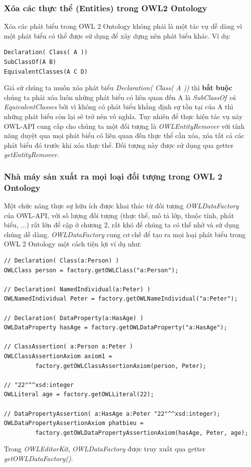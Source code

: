 \subsubsection{Xóa các thực thể (Entities) trong OWL2 Ontology}
Xóa các phát biểu trong OWL 2 Ontology không phải là một tác vụ dễ dàng vì một phát biểu có thể được sử dụng để xây dựng nên phát biểu khác. Ví dụ:
\begin{verbatim}
Declaration( Class( A ))
SubClassOf(A B)
EquivalentClasses(A C D)
\end{verbatim}
Giả sử chúng ta muốn xóa phát biểu \textit{Declaration( Class( A ))} thì \textbf{bắt buộc} chúng ta phải xóa luôn những phát biểu có liên quan đến A là \textit{SubClassOf và EquivalentClasses}  bởi vì không có phát biểu khẳng định sự tồn tại của A thì những phát biểu còn lại sẽ trở nên vô nghĩa. Tuy nhiên để thực hiện tác vụ này OWL-API cung cấp cho chúng ta một đối tượng là \textit{OWLEntityRemover} với tính năng duyệt qua mọi phát biểu có liên quan đến thực thể cần xóa, xóa tất cả các phát biểu đó trước khi xóa thực thể. Đối tượng này được sử dụng qua getter \textit{getEntityRemover}.

\subsubsection{Nhà máy sản xuất ra mọi loại đối tượng trong OWL 2 Ontology}
Một chức năng thực sự hữu ích được khai thác từ đối tượng \textit{OWLDataFactory} của OWL-API, với số lượng đối tượng (thực thể, mô tả lớp, thuộc tính, phát biểu, ...) rất lớn để cập ở chương 2, rất khó để chúng ta có thể nhớ và sử dụng chúng dễ dàng. \textit{OWLDataFactory} cung cơ chế để tạo ra mọi loại phát biểu trong OWL 2 Ontology một cách tiện lợi ví dụ như:
\begin{verbatim}
// Declaration( Class(a:Person) )
OWLClass person = factory.getOWLClass("a:Person");

// Declaration( NamedIndividual(a:Peter) )
OWLNamedIndividual Peter = factory.getOWLNameIndividual("a:Peter");

// Declaration( DataProperty(a:HasAge) )
OWLDataProperty hasAge = factory.getOWLDataProperty("a:HasAge");

// ClassAssertion( a:Person a:Peter )
OWLClassAssertionAxiom axiom1 = 
         factory.getOWLClassAssertionAxiom(person, Peter);
         
// "22"^^xsd:integer 
OWLLiteral age = factory.getOWLLiteral(22);

// DataPropertyAssertion( a:HasAge a:Peter "22"^^xsd:integer); 
OWLDataPropertyAssertionAxiom phatbieu = 
         factory.getOWLDataPropertyAssertionAxiom(hasAge, Peter, age);
\end{verbatim}
Trong \textit{OWLEditorKit}, \textit{OWLDataFactory} được truy xuất qua getter \textit{getOWLDataFactory()}.

